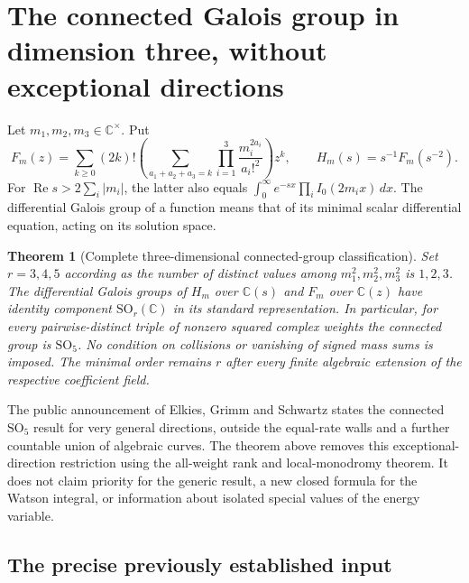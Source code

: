 \documentclass[11pt,a4paper]{article}
\newtheorem{theorem}{Theorem}[section]
\theoremstyle{definition}
\theoremstyle{remark}
\numberwithin{equation}{section}
\begin{document}
\clearpage

\section{The connected Galois group in dimension three, without exceptional directions}
\label{p6:fs:sec}

Let $m_1,m_2,m_3\in\mathbb C^\times$. Put
\[
 F_m(z)=\sum_{k\ge0}(2k)!\left(\sum_{a_1+a_2+a_3=k}
              \prod_{i=1}^3\frac{m_i^{2a_i}}{a_i!^2}\right)z^k,
 \qquad H_m(s)=s^{-1}F_m(s^{-2}).
\]
For $\operatorname{Re}s>2\sum_i|m_i|$, the latter also equals
$\int_0^\infty e^{-sx}\prod_i I_0(2m_ix)\,dx$.
The differential Galois group of a function means that of its
minimal scalar differential equation, acting on its solution space.

\begin{theorem}[Complete three-dimensional connected-group classification]
\label{p6:fs:main}
Set $r=3,4,5$ according as the number of distinct values among
$m_1^2,m_2^2,m_3^2$ is $1,2,3$. The differential Galois groups of
$H_m$ over $\mathbb C(s)$ and $F_m$ over $\mathbb C(z)$ have identity
component $\mathrm{SO}_r(\mathbb C)$ in its standard representation.
In particular, for every pairwise-distinct triple of nonzero squared
complex weights the connected group is $\mathrm{SO}_5$.
No condition on collisions or vanishing of signed mass sums is imposed.
The minimal order remains $r$ after every finite algebraic extension
of the respective coefficient field.
\end{theorem}

The public announcement of Elkies, Grimm and Schwartz
\cite{p5:BG_WatsonAnnouncement} states the connected $\mathrm{SO}_5$
result for very general directions, outside the equal-rate walls
and a further countable union of algebraic curves. The theorem above
removes this exceptional-direction restriction using the all-weight
rank and local-monodromy theorem. It does not claim priority for the
generic result, a new closed formula for the Watson integral, or
information about isolated special values of the energy variable.

\subsection{The precise previously established input}
\end{document}
